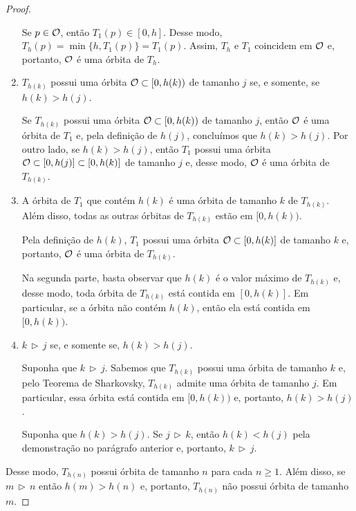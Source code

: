 \begin{proof}
\begin{enumerate}[label=\alph*)]
Se $p \in \mathcal{O}$, então $T_1(p) \in [0, h]$. Desse modo, $T_h(p) = \min \{h, T_1(p)\} = T_1(p)$.
Assim, $T_h$ e $T_1$ coincidem em $\mathcal{O}$ e, portanto, $\mathcal{O}$ é uma órbita de $T_h$.

\item $T_{h(k)}$ possui uma órbita $\mathcal{O} \subset [0, h(k))$ de tamanho $j$ se, e somente, se $h(k) > h(j)$.

Se $T_{h(k)}$ possui uma órbita $\mathcal{O} \subset [0, h(k))$ de tamanho $j$, então $\mathcal{O}$ é uma órbita de $T_1$ e, pela definição de $h(j)$, concluímos que $h(k) > h(j)$.
Por outro lado, se $h(k) > h(j)$, então $T_1$ possui uma órbita $\mathcal{O} \subset [0, h(j)] \subset [0, h(k)]$ de tamanho $j$ e, desse modo, $\mathcal{O}$ é uma órbita de $T_{h(k)}$.

\item A órbita de $T_1$ que contém $h(k)$ é uma órbita de tamanho $k$ de $T_{h(k)}$.
Além disso, todas as outras órbitas de $T_{h(k)}$ estão em $[0, h(k))$. 

Pela definição de $h(k)$, $T_1$ possui uma órbita $\mathcal{O} \subset [0, h(k)]$ de tamanho $k$ e, portanto, $\mathcal{O}$ é uma órbita de $T_{h(k)}$.

Na segunda parte, basta observar que $h(k)$ é o valor máximo de $T_{h(k)}$ e, desse modo, toda órbita de $T_{h(k)}$ está contida em $[0, h(k)]$.
Em particular, se a órbita não contém $h(k)$, então ela está contida em $[0, h(k))$.

\item $k \, \triangleright \, j$ se, e somente se, $h(k) > h(j)$.

Suponha que $k \, \triangleright \, j$. Sabemos que $T_{h(k)}$ possui uma órbita de tamanho $k$ e, pelo Teorema de Sharkovsky, $T_{h(k)}$ admite uma órbita de tamanho $j$. Em particular, essa órbita está contida em $[0, h(k))$ e, portanto, $h(k) > h(j)$.

Suponha que $h(k) > h(j)$. Se $j \, \triangleright \, k$, então $h(k) < h(j)$ pela demonstração no parágrafo anterior e, portanto, $k \, \triangleright \, j$.
\end{enumerate}

Desse modo, $T_{h(n)}$ possui órbita de tamanho $n$ para cada $n \geq 1$. Além disso, se $m \, \triangleright \, n$ então $h(m) > h(n)$ e, portanto, $T_{h(n)}$ não possui órbita de tamanho $m$.
\end{proof}
